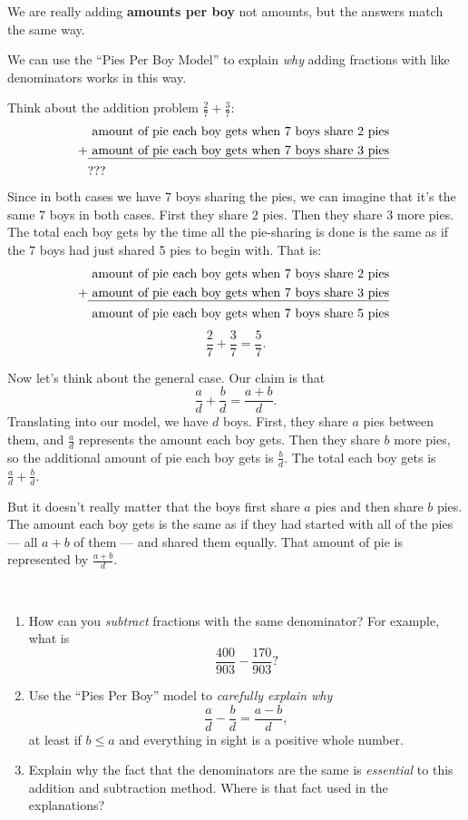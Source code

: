 We are really adding {\bf amounts per boy} not amounts, but the answers match the same way.

We can use the ``Pies Per Boy Model'' to explain \emph{why}  adding fractions with like denominators works in this way.  

Think about the addition problem $\frac 2 7 + \frac 3 7$:
\begin{align*}
&\text{ amount of pie each boy gets when 7 boys share 2 pies} \\
+ 
&\text{\underline{ amount of pie each boy gets when 7 boys share 3 pies} }\\ 
&???
\end{align*}
Since in both cases we have 7 boys sharing the pies, we can imagine that it's the same 7 boys in both cases.  First they share 2 pies.  Then they share 3 more pies.  The total each boy gets by the time all the pie-sharing is done is the same as if the 7 boys had just shared 5 pies to begin with.  That is:
\begin{align*}
&\text{ amount of pie each boy gets when 7 boys share 2 pies} \\
+ 
&\text{\underline{ amount of pie each boy gets when 7 boys share 3 pies} }\\ 
&\text{ amount of pie each boy gets when 7 boys share 5 pies}\\ 
\end{align*}
\[
\frac 2 7 + \frac 3 7 = \frac 5 7.
\]

Now let's think about the general case.  Our claim is that
\[
\frac a d + \frac b d = \frac{a+b}d.
\]
Translating into our model, we have $d$ boys.  First, they share $a$ pies between them, and $\frac a d$ represents the amount each boy gets.  Then they share $b$ more pies, so the additional amount of pie each boy gets is $\frac b d$.  The total each boy gets is $\frac a d + \frac b d$.

But it doesn't really matter that the boys first share $a$ pies and then share $b$ pies.  The amount each boy gets is the same as if they had started with all of the pies --- all $a+b$ of them --- and shared them equally.  That amount of pie is represented by $\frac{a+b}d$.  



\begin{thinkpair*}\ 
\begin{enumerate}
\item
How can you \emph{subtract} fractions with
the same denominator? For example, what is
\[
\frac{400 }{903} -\frac{170}{903}?
\]

\item
Use the ``Pies Per Boy'' model to \emph{carefully explain why}
\[
\frac a d - \frac b d = \frac{a-b}{d},
\]
at least if $b \leq a$ and everything in sight is a positive whole number.

\item
Explain why the fact that the denominators are the same is \emph{essential} to this addition and subtraction method.  Where is that fact used in the explanations?
\end{enumerate}
\end{thinkpair*}


